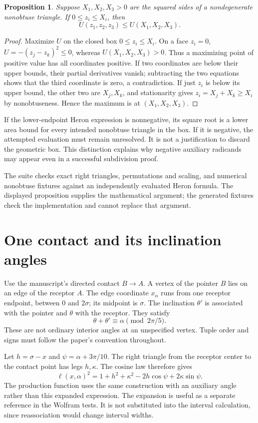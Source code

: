 \documentclass[11pt,a4paper]{article}
\newcommand{\code}[1]{\texttt{\detokenize{#1}}}
\newtheorem{proposition}{Proposition}[section]
\theoremstyle{remark}\newtheorem*{contract}{Implementation contract}\newtheorem*{auditnote}{Audit note}
\begin{document}
\begin{proposition}
Suppose $X_1,X_2,X_3>0$ are the squared sides of a nondegenerate nonobtuse
triangle. If $0\le z_i\le X_i$, then
\[
U(z_1,z_2,z_3)\le U(X_1,X_2,X_3).
\]
\end{proposition}
\begin{proof}
Maximize $U$ on the closed box $0\le z_i\le X_i$. On a face $z_i=0$,
$U=-(z_j-z_k)^2\le0$, whereas $U(X_1,X_2,X_3)>0$.
Thus a maximizing point of positive value has all coordinates positive.
If two coordinates are below their upper bounds, their partial derivatives
vanish; subtracting the two equations shows that the third coordinate is
zero, a contradiction. If just $z_i$ is below its upper bound, the other two
are $X_j,X_k$, and stationarity gives $z_i=X_j+X_k\ge X_i$ by
nonobtuseness. Hence the maximum is at $(X_1,X_2,X_3)$.
\end{proof}

If the lower-endpoint Heron expression is nonnegative, its square root is a
lower area bound for every intended nonobtuse triangle in the box. If it is
negative, the attempted evaluation must remain unresolved. It is not a
justification to discard the geometric box. This distinction explains why
negative auxiliary radicands may appear even in a successful subdivision
proof.

The suite checks exact right triangles, permutations and scaling, and
numerical nonobtuse fixtures against an independently evaluated Heron formula.
The displayed proposition supplies the mathematical argument; the generated
fixtures check the implementation and cannot replace that argument.

\section{One contact and its inclination angles}

Use the manuscript's directed contact $B\to A$. A vertex of the pointer $B$
lies on an edge of the receptor $A$. The edge coordinate $x_\alpha$ runs from
one receptor endpoint, between $0$ and $2\sigma$; its midpoint is $\sigma$.
The inclination $\theta'$ is associated with the pointer and $\theta$ with
the receptor. They satisfy
\[
\theta+\theta'\equiv\alpha\pmod{2\pi/5}.
\]
These are not ordinary interior angles at an unspecified vertex. Tuple order
and signs must follow the paper's convention throughout.

Let $h=\sigma-x$ and $\psi=\alpha+3\pi/10$. The right triangle from the
receptor center to the contact point has legs $h,\kappa$. The cosine law
therefore gives
\[
\ell(x,\alpha)^2
=1+h^2+\kappa^2-2h\cos\psi+2\kappa\sin\psi.
\]
The production function \code{ell_aux} uses the same construction with an
auxiliary angle rather than this expanded expression. The expansion is useful
as a separate reference in the Wolfram tests. It is not substituted into the
interval calculation, since reassociation would change interval widths.
\end{document}
